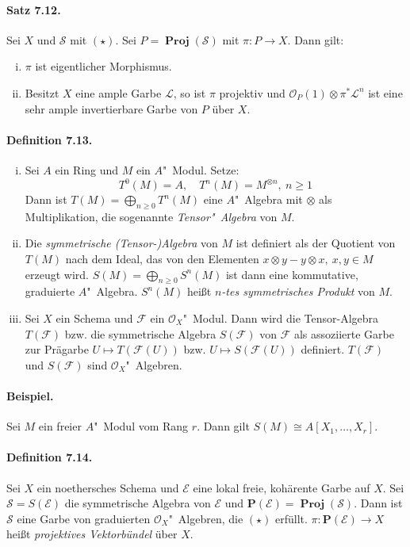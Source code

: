 \documentclass[11pt,b5paper,openany]{memoir}
\begin{document}
\paragraph{Satz 7.12.}\label{7.12} Sei $X$ und $\mathcal{S}$ mit $(\star)$. Sei $P=\operatorname{\mathbf{Proj}}(\mathcal{S})$ mit $\pi:P\to X$. Dann gilt:
\begin{enumerate}[(i)]
\item $\pi$ ist eigentlicher Morphismus.
\item Besitzt $X$ eine ample Garbe $\mathcal{L}$, so ist $\pi$ projektiv und $\mathcal{O}_P(1)\otimes\pi^\ast\mathcal{L}^n$ ist eine sehr ample invertierbare Garbe von $P$ über $X$.
\end{enumerate}

\paragraph{Definition 7.13.}\label{7.13} \begin{enumerate}[(i)]
\item Sei $A$ ein Ring und $M$ ein $A$"~Modul. Setze:
\[T^0(M)=A,\quad T^n(M)= M^{\otimes n},\ n\geq 1 \]
Dann ist $T(M)=\bigoplus_{n\geq 0}T^n(M)$ eine $A$"~Algebra mit $\otimes$ als Multiplikation, die sogenannte \textit{Tensor"~Algebra} von $M$.
\item Die \textit{symmetrische (Tensor-)Algebra} von $M$ ist definiert als der Quotient von $T(M)$ nach dem Ideal, das von den Elementen $x\otimes y-y\otimes x,\ x,y\in M$ erzeugt wird. $S(M)=\bigoplus_{n\geq 0}S^n(M)$ ist dann eine kommutative, graduierte $A$"~Algebra. $S^n(M)$ heißt \textit{$n$-tes symmetrisches Produkt} von $M$.
\item Sei $X$ ein Schema und $\mathcal{F}$ ein $\mathcal{O}_X$"~Modul. Dann wird die Tensor-Algebra $T(\mathcal{F})$ bzw. die symmetrische Algebra $S(\mathcal{F})$ von $\mathcal{F}$ als assoziierte Garbe zur Prägarbe $U\mapsto T(\mathcal{F}(U))$ bzw. $U\mapsto S(\mathcal{F}(U))$ definiert. $T(\mathcal{F})$ und $S(\mathcal{F})$ sind $\mathcal{O}_X$"~Algebren.
\end{enumerate}

\paragraph{Beispiel.} Sei $M$ ein freier $A$"~Modul vom Rang $r$. Dann gilt $S(M)\cong A[X_1,\ldots,X_r]$.

\paragraph{Definition 7.14.}\label{7.14} Sei $X$ ein noethersches Schema und $\mathcal{E}$ eine lokal freie, kohärente Garbe auf $X$. Sei $\mathcal{S}=S(\mathcal{E})$ die symmetrische Algebra von $\mathcal{E}$ und $\mathbf{P}(\mathcal{E})=\operatorname{\mathbf{Proj}}(\mathcal{S})$. Dann ist $\mathcal{S}$ eine Garbe von graduierten $\mathcal{O}_X$"~Algebren, die $(\star)$ erfüllt. $\pi:\mathbf{P}(\mathcal{E})\to X$ heißt \textit{projektives Vektorbündel} über $X$.
\end{document}
